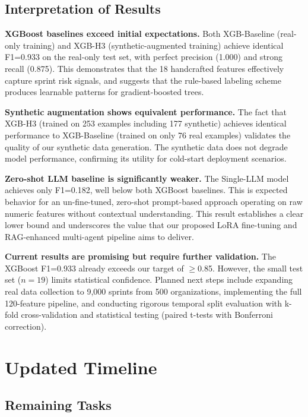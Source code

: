 \documentclass[journal]{IEEEtran}
\begin{document}
\subsection{Interpretation of Results}

\textbf{XGBoost baselines exceed initial expectations.} Both XGB-Baseline (real-only training) and XGB-H3 (synthetic-augmented training) achieve identical F1=0.933 on the real-only test set, with perfect precision (1.000) and strong recall (0.875). This demonstrates that the 18 handcrafted features effectively capture sprint risk signals, and suggests that the rule-based labeling scheme produces learnable patterns for gradient-boosted trees.

\textbf{Synthetic augmentation shows equivalent performance.} The fact that XGB-H3 (trained on 253 examples including 177 synthetic) achieves identical performance to XGB-Baseline (trained on only 76 real examples) validates the quality of our synthetic data generation. The synthetic data does not degrade model performance, confirming its utility for cold-start deployment scenarios.

\textbf{Zero-shot LLM baseline is significantly weaker.} The Single-LLM model achieves only F1=0.182, well below both XGBoost baselines. This is expected behavior for an un-fine-tuned, zero-shot prompt-based approach operating on raw numeric features without contextual understanding. This result establishes a clear lower bound and underscores the value that our proposed LoRA fine-tuning and RAG-enhanced multi-agent pipeline aims to deliver.

\textbf{Current results are promising but require further validation.} The XGBoost F1=0.933 already exceeds our target of $\geq$0.85. However, the small test set ($n=19$) limits statistical confidence. Planned next steps include expanding real data collection to 9,000 sprints from 500 organizations, implementing the full 120-feature pipeline, and conducting rigorous temporal split evaluation with k-fold cross-validation and statistical testing (paired t-tests with Bonferroni correction).

\section{Updated Timeline}

\subsection{Remaining Tasks}
\end{document}
